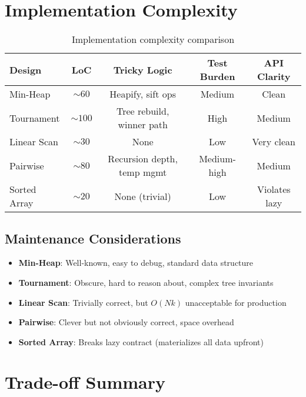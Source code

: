 \documentclass[11pt]{article}
\begin{document}
\section{Implementation Complexity}

\begin{table}[h]
\centering
\begin{tabular}{@{}lcccc@{}}
\toprule
\textbf{Design}  & \textbf{LoC} & \textbf{Tricky Logic}       & \textbf{Test Burden} & \textbf{API Clarity} \\ \midrule
Min-Heap         & $\sim 60$    & Heapify, sift ops           & Medium               & Clean                \\
Tournament       & $\sim 100$   & Tree rebuild, winner path   & High                 & Medium               \\
Linear Scan      & $\sim 30$    & None                        & Low                  & Very clean           \\
Pairwise         & $\sim 80$    & Recursion depth, temp mgmt  & Medium-high          & Medium               \\
Sorted Array     & $\sim 20$    & None (trivial)              & Low                  & Violates lazy        \\ \bottomrule
\end{tabular}
\caption{Implementation complexity comparison}
\end{table}

\subsection{Maintenance Considerations}

\begin{itemize}
    \item \textbf{Min-Heap}: Well-known, easy to debug, standard data structure
    \item \textbf{Tournament}: Obscure, hard to reason about, complex tree invariants
    \item \textbf{Linear Scan}: Trivially correct, but $O(Nk)$ unacceptable for production
    \item \textbf{Pairwise}: Clever but not obviously correct, space overhead
    \item \textbf{Sorted Array}: Breaks lazy contract (materializes all data upfront)
\end{itemize}

\section{Trade-off Summary}
\end{document}
